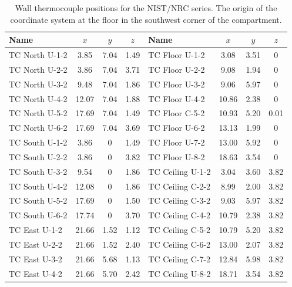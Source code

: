 \begin{table}[h!]
\caption[Wall thermocouple positions for the NIST/NRC series.]
{Wall thermocouple positions for the NIST/NRC series. The origin of the coordinate system at the floor in the southwest
corner of the compartment.}
\begin{center}
\begin{tabular}{|l|c|c|c||l|c|c|c|}
\hline
Name              & $x$   & $y$  & $z$      & Name              & $x$   & $y$   & $z$       \\ \hline \hline
TC North U-1-2    & 3.85  & 7.04 & 1.49     & TC Floor U-1-2    & 3.08  & 3.51  & 0         \\ \hline
TC North U-2-2    & 3.86  & 7.04 & 3.71     & TC Floor U-2-2    & 9.08  & 1.94  & 0         \\ \hline
TC North U-3-2    & 9.48  & 7.04 & 1.86     & TC Floor U-3-2    & 9.06  & 5.97  & 0         \\ \hline
TC North U-4-2    & 12.07 & 7.04 & 1.88     & TC Floor U-4-2    & 10.86 & 2.38  & 0         \\ \hline
TC North U-5-2    & 17.69 & 7.04 & 1.49     & TC Floor C-5-2    & 10.93 & 5.20  & 0.01      \\ \hline
TC North U-6-2    & 17.69 & 7.04 & 3.69     & TC Floor U-6-2    & 13.13 & 1.99  & 0         \\ \hline
TC South U-1-2    & 3.86  & 0    & 1.49     & TC Floor U-7-2    & 13.00 & 5.92  & 0         \\ \hline
TC South U-2-2    & 3.86  & 0    & 3.82     & TC Floor U-8-2    & 18.63 & 3.54  & 0         \\ \hline
TC South U-3-2    & 9.54  & 0    & 1.86     & TC Ceiling U-1-2  & 3.04  & 3.60  & 3.82      \\ \hline
TC South U-4-2    & 12.08 & 0    & 1.86     & TC Ceiling C-2-2  & 8.99  & 2.00  & 3.82      \\ \hline
TC South U-5-2    & 17.69 & 0    & 1.50     & TC Ceiling C-3-2  & 9.03  & 5.97  & 3.82      \\ \hline
TC South U-6-2    & 17.74 & 0    & 3.70     & TC Ceiling C-4-2  & 10.79 & 2.38  & 3.82      \\ \hline
TC East U-1-2     & 21.66 & 1.52 & 1.12     & TC Ceiling C-5-2  & 10.79 & 5.20  & 3.82      \\ \hline
TC East U-2-2     & 21.66 & 1.52 & 2.40     & TC Ceiling C-6-2  & 13.00 & 2.07  & 3.82      \\ \hline
TC East U-3-2     & 21.66 & 5.68 & 1.13     & TC Ceiling C-7-2  & 12.84 & 5.98  & 3.82      \\ \hline
TC East U-4-2     & 21.66 & 5.70 & 2.42     & TC Ceiling U-8-2  & 18.71 & 3.54  & 3.82      \\ \hline
\end{tabular}
\end{center}
\label{NIST_NRC_Wall_Coords}
\end{table}


